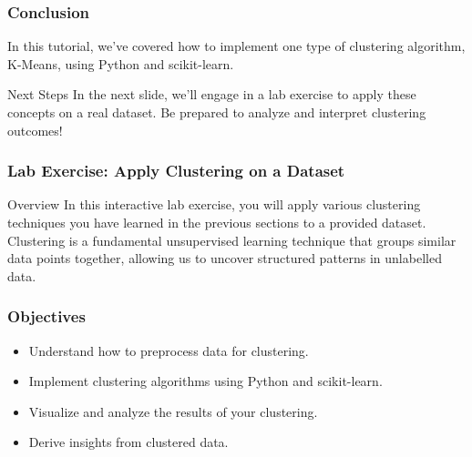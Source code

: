 \documentclass[aspectratio=169]{beamer}
\begin{document}
\begin{frame}
    \frametitle{Conclusion}
    In this tutorial, we've covered how to implement one type of clustering algorithm, K-Means, using Python and scikit-learn.
    \begin{block}{Next Steps}
        In the next slide, we'll engage in a lab exercise to apply these concepts on a real dataset. Be prepared to analyze and interpret clustering outcomes!
    \end{block}
\end{frame}

\begin{frame}
  \frametitle{Lab Exercise: Apply Clustering on a Dataset}
  \begin{block}{Overview}
    In this interactive lab exercise, you will apply various clustering techniques you have learned in the previous sections to a provided dataset. Clustering is a fundamental unsupervised learning technique that groups similar data points together, allowing us to uncover structured patterns in unlabelled data.
  \end{block}
\end{frame}

\begin{frame}
  \frametitle{Objectives}
  \begin{itemize}
    \item Understand how to preprocess data for clustering.
    \item Implement clustering algorithms using Python and scikit-learn.
    \item Visualize and analyze the results of your clustering.
    \item Derive insights from clustered data.
  \end{itemize}
\end{frame}
\end{document}
